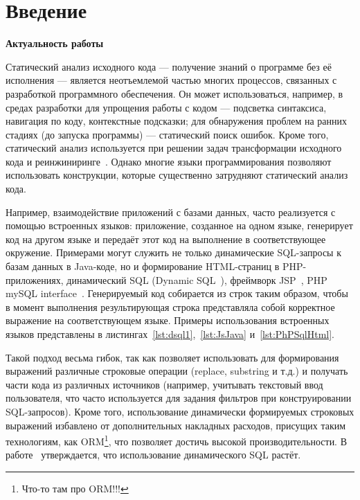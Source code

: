 \chapter*{Введение}                         %
\textbf{Актуальность работы}

Статический анализ исходного кода --- получение знаний о программе без её исполнения --- является неотъемлемой частью многих процессов, связанных с разработкой программного обеспечения. Он может использоваться, например, в средах разработки для упрощения работы с кодом --- подсветка синтаксиса, навигация по коду, контекстные подсказки; для обнаружения проблем на ранних стадиях (до запуска программы) --- статический поиск ошибок.  Кроме того, статический анализ используется при решении задач трансформации исходного кода и реинжиниринге~\cite{reengANT}. Однако многие языки программирования позволяют использовать конструкции, которые существенно затрудняют статический анализ кода.

Например, взаимодействие приложений с базами данных, часто реализуется с помощью встроенных языков: приложение, созданное на одном языке, генерирует код на другом языке и передаёт этот код на выполнение в соответствующее окружение. Примерами могут служить не только динамические SQL-запросы к базам данных в Java-коде, но и формирование HTML-страниц в PHP-приложениях, динамический SQL (Dynamic SQL~\cite{DSQLISO}), фреймворк JSP~\cite{JSP}, PHP mySQL interface~\cite{PHPmySQL}. Генерируемый код собирается из строк таким образом, чтобы в момент выполнения результирующая строка представляла собой корректное выражение на соответствующем языке. Примеры использования встроенных языков представлены в листингах~\ref{lst:dsql1},~\ref{lst:JsJava} и~\ref{lst:PhPSqlHtml}. 

Такой подход весьма гибок, так как позволяет использовать для формирования выражений различные строковые операции (replace, substring и т.д.) и получать части кода из различных источников (например, учитывать текстовый ввод пользователя, что часто используется для задания фильтров при конструировании SQL-запросов). Кроме того, использование динамически формируемых строковых выражений избавлено от  дополнительных накладных расходов, присущих таким технологиям, как ORM\footnote{Что-то там про ORM!!!}, что позволяет достичь высокой производительности. В работе~\cite{DSQLInActiveUse} утверждается, что использование динамического SQL растёт.

